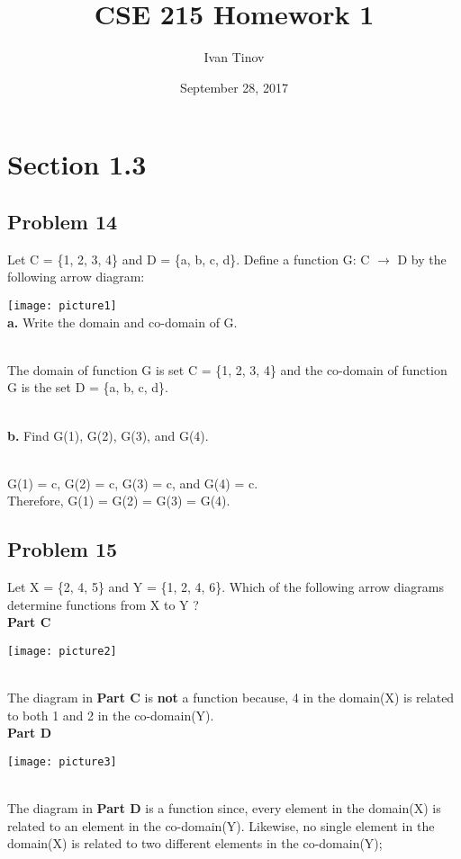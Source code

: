 \documentclass{article}
\title{CSE 215 Homework 1}
\author{Ivan Tinov}
\date{September 28, 2017}
\begin{document}
\maketitle
\parindent 

\section*{Section 1.3}
\subsection*{Problem 14}
Let C = \{1, 2, 3, 4\} and D = \{a, b, c, d\}. 
Define a function G: C $\rightarrow$ D by the following arrow diagram:

\texttt{[image: picture1]}
\\ \textbf{a.} Write the domain and co-domain of G.

\\ The domain of function G is set C = \{1, 2, 3, 4\} and the co-domain
of function G is the set D = \{a, b, c, d\}.

\\ \textbf{b.} Find G(1), G(2), G(3), and G(4).

\\ G(1) = c, G(2) = c, G(3) = c, and G(4) = c.
\\ Therefore, G(1) = G(2) = G(3) = G(4). 

\subsection*{Problem 15}
Let X = \{2, 4, 5\} and Y = \{1, 2, 4, 6\}. Which of the following
arrow diagrams determine functions from X to Y ?
\\ \textbf{Part C}

\texttt{[image: picture2]}

\\ The diagram in \textbf{Part C} is \textbf{not} a function because, 4 in the domain(X) is related to both 1 and 2 in the co-domain(Y).
\\ \textbf{Part D}

\texttt{[image: picture3]}

\\ The diagram in \textbf{Part D} is a function since, every element in the domain(X) is related to an element in the co-domain(Y). Likewise, no single element in the domain(X) is related to two different elements in the co-domain(Y);
\end{document}
